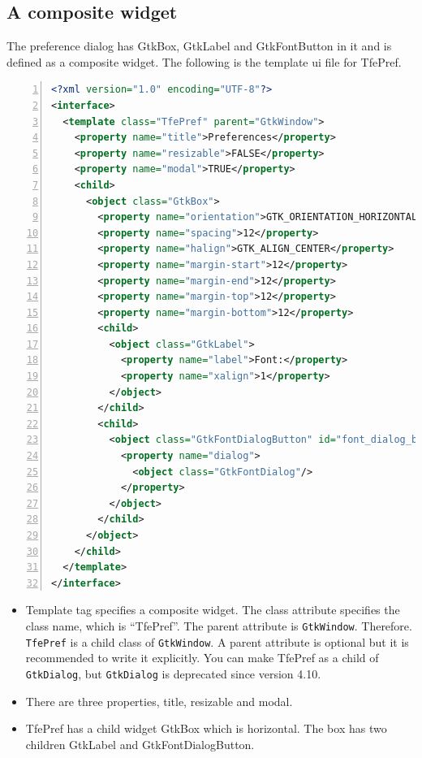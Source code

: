 \subsection{A composite widget}\label{a-composite-widget}

The preference dialog has GtkBox, GtkLabel and GtkFontButton in it and
is defined as a composite widget. The following is the template ui file
for TfePref.

\begin{lstlisting}[language=XML, numbers=left]
<?xml version="1.0" encoding="UTF-8"?>
<interface>
  <template class="TfePref" parent="GtkWindow">
    <property name="title">Preferences</property>
    <property name="resizable">FALSE</property>
    <property name="modal">TRUE</property>
    <child>
      <object class="GtkBox">
        <property name="orientation">GTK_ORIENTATION_HORIZONTAL</property>
        <property name="spacing">12</property>
        <property name="halign">GTK_ALIGN_CENTER</property>
        <property name="margin-start">12</property>
        <property name="margin-end">12</property>
        <property name="margin-top">12</property>
        <property name="margin-bottom">12</property>
        <child>
          <object class="GtkLabel">
            <property name="label">Font:</property>
            <property name="xalign">1</property>
          </object>
        </child>
        <child>
          <object class="GtkFontDialogButton" id="font_dialog_btn">
            <property name="dialog">
              <object class="GtkFontDialog"/>
            </property>
          </object>
        </child>
      </object>
    </child>
  </template>
</interface>
\end{lstlisting}

\begin{itemize}
\tightlist
\item
  Template tag specifies a composite widget. The class attribute
  specifies the class name, which is ``TfePref''. The parent attribute
  is \passthrough{\lstinline!GtkWindow!}. Therefore.
  \passthrough{\lstinline!TfePref!} is a child class of
  \passthrough{\lstinline!GtkWindow!}. A parent attribute is optional
  but it is recommended to write it explicitly. You can make TfePref as
  a child of \passthrough{\lstinline!GtkDialog!}, but
  \passthrough{\lstinline!GtkDialog!} is deprecated since version 4.10.
\item
  There are three properties, title, resizable and modal.
\item
  TfePref has a child widget GtkBox which is horizontal. The box has two
  children GtkLabel and GtkFontDialogButton.
\end{itemize}

